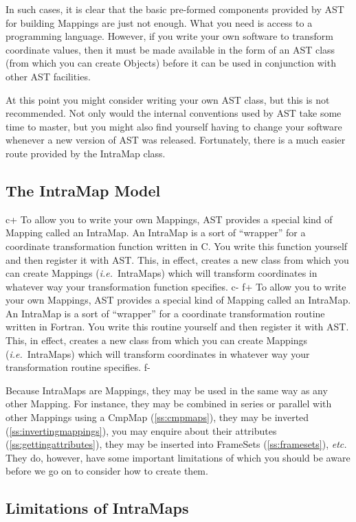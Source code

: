 \documentclass[twoside,11pt]{article}
\newcommand{\secref}[1]{\S\ref{#1}}
\renewcommand{\secref}[1]{\ref{#1}}
\begin{document}
In such cases, it is clear that the basic pre-formed components
provided by AST for building Mappings are just not enough. What you
need is access to a programming language. However, if you write your
own software to transform coordinate values, then it must be made
available in the form of an AST class (from which you can create
Objects) before it can be used in conjunction with other AST
facilities.

At this point you might consider writing your own AST class, but this
is not recommended. Not only would the internal conventions used by
AST take some time to master, but you might also find yourself having
to change your software whenever a new version of AST was
released. Fortunately, there is a much easier route provided by the
IntraMap class.

\subsection{The IntraMap Model}

c+
To allow you to write your own Mappings, AST provides a special kind
of Mapping called an IntraMap. An IntraMap is a sort of ``wrapper''
for a coordinate transformation function written in C. You write this
function yourself and then register it with AST. This, in effect,
creates a new class from which you can create Mappings
({\em{i.e.}}\ IntraMaps) which will transform coordinates in whatever
way your transformation function specifies.
c-
f+
To allow you to write your own Mappings, AST provides a special kind
of Mapping called an IntraMap. An IntraMap is a sort of ``wrapper''
for a coordinate transformation routine written in Fortran. You write
this routine yourself and then register it with AST. This, in effect,
creates a new class from which you can create Mappings
({\em{i.e.}}\ IntraMaps) which will transform coordinates in whatever
way your transformation routine specifies.
f-

Because IntraMaps are Mappings, they may be used in the same way as
any other Mapping. For instance, they may be combined in series or
parallel with other Mappings using a CmpMap (\secref{ss:cmpmaps}),
they may be inverted (\secref{ss:invertingmappings}), you may enquire
about their attributes (\secref{ss:gettingattributes}), they may be
inserted into FrameSets (\secref{ss:framesets}), {\em{etc.}} They do,
however, have some important limitations of which you should be aware
before we go on to consider how to create them.

\subsection{\label{ss:intramaplimitations}Limitations of IntraMaps}
\end{document}
